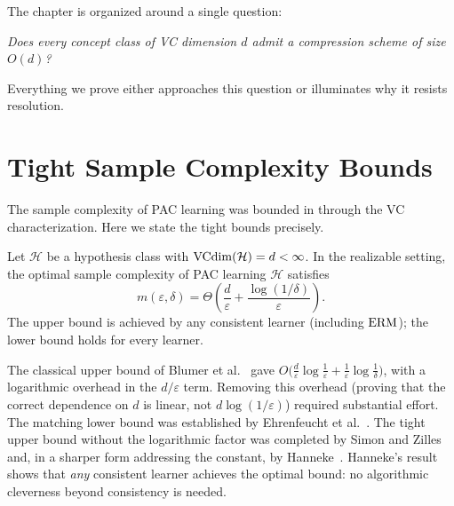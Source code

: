 \medskip

The chapter is organized around a single question:

\begin{center}
\itshape
Does every concept class of VC dimension $d$ admit a compression scheme of
size $O(d)$?
\end{center}

Everything we prove either approaches this question or illuminates why it
resists resolution.



\section{Tight Sample Complexity Bounds}
\label{sec:sample-bounds}

The sample complexity of PAC learning was bounded in  through the
VC characterization.  Here we state the tight bounds precisely.

\begin{thm}
\label{thm:sample-realizable}
Let $\mathcal{H}$ be a hypothesis class with $\mathrm{VCdim}(\mathcal{H}) = d < \infty$.
In the realizable setting, the optimal sample complexity of PAC learning
$\mathcal{H}$ satisfies
\[
  m(\varepsilon, \delta) = \Theta\!\left(\frac{d}{\varepsilon}
    + \frac{\log(1/\delta)}{\varepsilon}\right).
\]
The upper bound is achieved by any consistent learner (including $\mathrm{ERM}$); the
lower bound holds for every learner.
\end{thm}

\begin{remark}
\label{rmk:sample-history}
The classical upper bound of Blumer et al.~\cite{BlumerEhrenfeuchtHausslerWarmuth1989}
gave $O\!\bigl(\frac{d}{\varepsilon}\log\frac{1}{\varepsilon} +
\frac{1}{\varepsilon}\log\frac{1}{\delta}\bigr)$, with a logarithmic overhead
in the $d/\varepsilon$ term.  Removing this overhead (proving that the correct
dependence on $d$ is linear, not $d \log(1/\varepsilon)$) required substantial
effort.  The matching lower bound was established by Ehrenfeucht et
al.~\cite{EhrenfeuchtHausslerKearnsValiant1989}.  The tight upper bound without
the logarithmic factor was completed by Simon and Zilles~\cite{SimonZilles2015}
and, in a sharper form addressing the constant, by
Hanneke~\cite{Hanneke2016}.  Hanneke's result shows that \emph{any} consistent
learner achieves the optimal bound: no algorithmic cleverness beyond
consistency is needed.
\end{remark}

